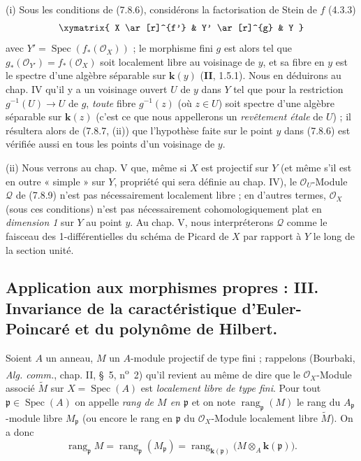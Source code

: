 \begin{remarks}[7.8.10]
\textnormal{(i)} Sous les conditions de (7.8.6), considérons la factorisation de
Stein de $f$ (4.3.3)
\[
\xymatrix{
  X \ar[r]^{f'} & Y' \ar[r]^{g} & Y
}
\]
avec $Y'=\operatorname{Spec}(f_*(\mathscr O_X))$ ; le morphisme fini $g$ est alors
tel que $g_*(\mathscr O_{Y'})=f_*(\mathscr O_X)$ soit localement libre au
voisinage de $y$, et sa fibre en $y$ est le spectre d'une algèbre séparable sur
$\boldsymbol{k}(y)$ (\textbf{II}, 1.5.1). Nous en déduirons au chap. IV qu'il y a un voisinage
ouvert $U$ de $y$ dans $Y$ tel que pour la restriction $g^{-1}(U)\to U$ de $g$,
\emph{toute} fibre $g^{-1}(z)$ (où $z\in U$) soit spectre d'une algèbre séparable
sur $\boldsymbol{k}(z)$ (c'est ce que nous appellerons un \emph{revêtement étale} de
$U$) ; il résultera alors de (7.8.7, (ii)) que l'hypothèse faite sur le point
$y$ dans (7.8.6) est vérifiée aussi en tous les points d'un voisinage de $y$.

\medskip
\textnormal{(ii)} Nous verrons au chap. V que, même si $X$ est projectif sur $Y$
(et même s'il est en outre « simple » sur $Y$, propriété qui sera définie au
chap. IV), le $\mathscr O_U$-Module $\mathscr Q$ de (7.8.9) n'est pas
nécessairement localement libre ; en d'autres termes, $\mathscr O_X$ (sous ces
conditions) n'est pas nécessairement cohomologiquement plat en \emph{dimension
1} sur $Y$ au point $y$. Au chap. V, nous interpréterons $\mathscr Q$ comme le
faisceau des 1-différentielles du schéma de Picard de $X$ par rapport à $Y$ le
long de la section unité.
\end{remarks}

\subsection{Application aux morphismes propres : III. Invariance de la
caractéristique d'Euler-Poincaré et du polynôme de Hilbert.}
\label{subsection:III.7.9.fr}
\label{III.7.9.fr}

\begin{env}[7.9.1]
\label{III.7.9.1.fr}
Soient $A$ un anneau, $M$ un $A$-module projectif de type fini ; rappelons
(Bourbaki, \emph{Alg. comm.}, chap. II, \S~5, n\textsuperscript{o}~2) qu'il
revient au même de dire que le $\mathscr O_X$-Module associé $\widetilde M$ sur
$X=\operatorname{Spec}(A)$ est \emph{localement libre de type fini}. Pour tout
$\mathfrak p\in\operatorname{Spec}(A)$ on appelle \emph{rang de $M$ en
$\mathfrak p$} et on note $\operatorname{rang}_{\mathfrak p}(M)$ le rang du
$A_{\mathfrak p}$-module libre $M_{\mathfrak p}$ (ou encore le rang en
$\mathfrak p$ du $\mathscr O_X$-Module localement libre $\widetilde M$). On a
donc
\[
  \operatorname{rang}_{\mathfrak p}M
  =\operatorname{rang}_{\mathfrak p}(M_{\mathfrak p})
  =\operatorname{rang}_{\mathbf{k}(\mathfrak p)}
  \bigl(M\otimes_A\boldsymbol{k}(\mathfrak p)\bigr).
  \tag{7.9.1.1}\label{III.7.9.1.1.fr}
\]
\end{env}

